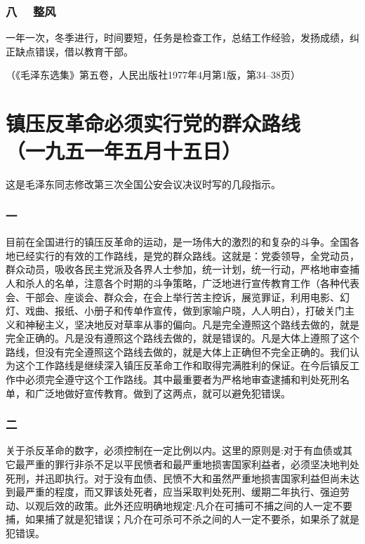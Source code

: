 \documentclass[cn,11pt,chinese]{elegantbook}
\def\myformat#1{\hfil\hfil #1}
\begin{document}
\subsubsection*{\myformat{八　 整风}}
一年一次，冬季进行，时间要短，任务是检查工作，总结工作经验，发扬成绩，纠正缺点错误，借以教育干部。\\
\begin{flushright}（《毛泽东选集》第五卷，人民出版社1977年4月第1版，第34--38页）\end{flushright}
\newpage\section*{\myformat{镇压反革命必须实行党的群众路线}\\\myformat{（一九五一年五月十五日）}}
\begin{introduction}\item  这是毛泽东同志修改第三次全国公安会议决议时写的几段指示。\end{introduction}
\subsubsection*{\myformat{一}}
目前在全国进行的镇压反革命的运动，是一场伟大的激烈的和复杂的斗争。全国各地已经实行的有效的工作路线，是党的群众路线。这就是：党委领导，全党动员，群众动员，吸收各民主党派及各界人士参加，统一计划，统一行动，严格地审查捕人和杀人的名单，注意各个时期的斗争策略，广泛地进行宣传教育工作（各种代表会、干部会、座谈会、群众会，在会上举行苦主控诉，展览罪证，利用电影、幻灯、戏曲、报纸、小册子和传单作宣传，做到家喻户晓，人人明白），打破关门主义和神秘主义，坚决地反对草率从事的偏向。凡是完全遵照这个路线去做的，就是完全正确的。凡是没有遵照这个路线去做的，就是错误的。凡是大体上遵照了这个路线，但没有完全遵照这个路线去做的，就是大体上正确但不完全正确的。我们认为这个工作路线是继续深入镇压反革命工作和取得完满胜利的保证。在今后镇反工作中必须完全遵守这个工作路线。其中最重要者为严格地审查逮捕和判处死刑名单，和广泛地做好宣传教育。做到了这两点，就可以避免犯错误。\\
\subsubsection*{\myformat{二}}
关于杀反革命的数字，必须控制在一定比例以内。这里的原则是:对于有血债或其它最严重的罪行非杀不足以平民愤者和最严重地损害国家利益者，必须坚决地判处死刑，并迅即执行。对于没有血债、民愤不大和虽然严重地损害国家利益但尚未达到最严重的程度，而又罪该处死者，应当采取判处死刑、缓期二年执行、强迫劳动、以观后效的政策。此外还应明确地规定:凡介在可捕可不捕之间的人一定不要捕，如果捕了就是犯错误；凡介在可杀可不杀之间的人一定不要杀，如果杀了就是犯错误。\\
\end{document}
